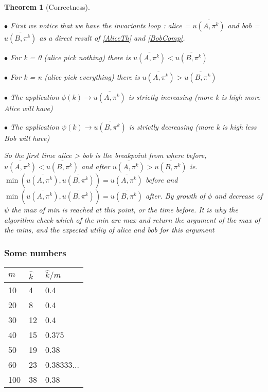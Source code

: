 \documentclass[a4paper, english, 10pt]{article}
\newtheorem{theorem}{Theorem}
\begin{document}
\begin{theorem}[Correctness] \ 
	
	$\bullet$
	First we notice that we have the invariants loop :
	alice = $\overline{u(A, \pi^k)}$ and bob = $ \overline{u(B, \pi^k)} $ as a direct result of \ref{AliceTh} and \ref{BobComp}.
	
	
	$\bullet$ For k = 0 (alice pick nothing) there is $\overline{u(A, \pi^k)} < \overline{u(B, \pi^k)} $
	
	$\bullet$ For k = n (alice pick everything) there is  $\overline{u(A, \pi^k)} > \overline{u(B, \pi^k)} $
	
	$\bullet$ The application $\phi(k) \rightarrow \overline{u(A, \pi^k)} $ is strictly increasing (more k is high more Alice will have)
	
	$\bullet$ The application $\psi(k) \rightarrow \overline{u(B, \pi^k)} $ is strictly decreasing (more k is high less Bob will have)
	
	So the first time alice > bob is the breakpoint from where before, $\overline{u(A, \pi^k)} < \overline{u(B, \pi^k)} $ and after $\overline{u(A, \pi^k)} > \overline{u(B, \pi^k)} $ ie.
	$ \min(\overline{u(A, \pi^k)} ,\overline{u(B, \pi^k)} ) = \overline{u(A, \pi^k)}$ before and 
	$ \min(\overline{u(A, \pi^k)} ,\overline{u(B, \pi^k)} ) = \overline{u(B, \pi^k)} $ after.
	By growth of $\phi$ and decrease of $\psi$ the max of min is reached at this point, or the time before. It is why the algorithm check which of the min are max and return the argument of the max of the mins, and the expected utiliy of alice and bob for this argument
	

\end{theorem}

\subsubsection{Some numbers}

\begin{tabular}{lll}
  \toprule
  $m$ & $\hat{k}$ & $\hat{k} / m$\\
  \midrule
  10 & 4 & 0.4\\
  20 & 8 & 0.4\\
  30 & 12 & 0.4\\
  40 & 15 & 0.375\\
  50 & 19 & 0.38\\
  60 & 23 & 0.38333...\\
  100 & 38 & 0.38\\
  \bottomrule
\end{tabular}



% 
% 
\end{document}
